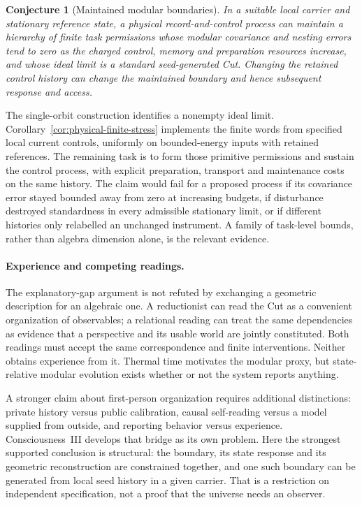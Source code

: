 \documentclass[12pt]{article}
\newtheorem{conjecture}[theorem]{Conjecture}
\theoremstyle{definition}
\theoremstyle{remark}
\newcounter{none}
\begin{document}
\begin{conjecture}[Maintained modular boundaries]\label{conj:maintained}
In a suitable local carrier and stationary reference state, a physical
record-and-control process can maintain a hierarchy of finite task
permissions whose modular covariance and nesting errors tend to zero as the
charged control, memory and preparation resources increase, and whose ideal
limit is a standard seed-generated Cut. Changing the retained control history
can change the maintained boundary and hence subsequent response and access.
\end{conjecture}
The single-orbit construction identifies a nonempty ideal limit.
Corollary~\ref{cor:physical-finite-stress} implements the finite words
from specified local current controls, uniformly on bounded-energy
inputs with retained references. The remaining task is to form those
primitive permissions and sustain the control process, with explicit
preparation, transport and maintenance costs on the same history.
The claim would fail for a proposed process if its covariance error stayed
bounded away from zero at increasing budgets, if disturbance destroyed
standardness in every admissible stationary limit, or if different histories
only relabelled an unchanged instrument. A family of task-level bounds,
rather than algebra dimension alone, is the relevant evidence.

\paragraph{Experience and competing readings.}
The explanatory-gap argument \cite{Chalmers} is not refuted by exchanging a
geometric description for an algebraic one. A reductionist can read the Cut
as a convenient organization of observables; a relational reading can treat
the same dependencies as evidence that a perspective and its usable world
are jointly constituted. Both readings must accept the same correspondence
and finite interventions. Neither obtains experience from it. Thermal time
\cite{CR} motivates the modular proxy, but state-relative modular evolution
exists whether or not the system reports anything.

A stronger claim about first-person organization requires additional
distinctions: private history versus public calibration, causal self-reading
versus a model supplied from outside, and reporting behavior versus experience.
Consciousness~III develops that bridge as its own problem. Here the strongest
supported conclusion is structural: the boundary, its state response and its
geometric reconstruction are constrained together, and one such boundary can
be generated from local seed history in a given carrier. That is a restriction
on independent specification, not a proof that the universe needs an observer.
\end{document}
